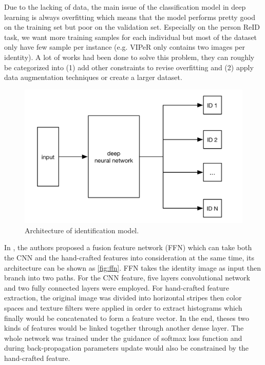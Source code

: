 Due to the lacking of data, the main issue of the classification model in deep
learning is always overfitting which means that the model performs pretty good 
on the training set but poor on the validation set. Especially on the person 
ReID task, we want more training samples for each individual but most of the 
dataset only have few sample per instance (e.g. VIPeR only contains two images 
per identity). A lot of works had been done to solve this problem, they can  
roughly be categorized into
(1) add other constraints to revise overfitting and
(2) apply data augmentation techniques or create a larger dataset.

\begin{figure}
    \begin{center}
    \includegraphics[scale=0.8]{figures/id_model.png}
    \end{center}
    \caption{Architecture of identification model.}
    \label{fig:id-model}
\end{figure}

In \cite{feature-fusion-net-2016}, the authors proposed a fusion feature
network (FFN) which can take both the CNN and the hand-crafted 
features into consideration at the same time, its architecture can be shown as
\autoref{fig:ffn}. FFN takes the identity image as input then branch into two
paths. 
For the CNN feature, five layers convolutional network and two fully 
connected layers were employed. For hand-crafted feature extraction, the 
original image was divided into horizontal stripes then color spaces and 
texture filters were applied in order to extract histograms which finally would 
be concatenated to form a feature vector. 
In the end, theses two kinds of features would be linked together through 
another dense layer. The whole network was trained under the guidance of 
softmax loss function and during back-propagation parameters update would
also be constrained by the hand-crafted feature.

